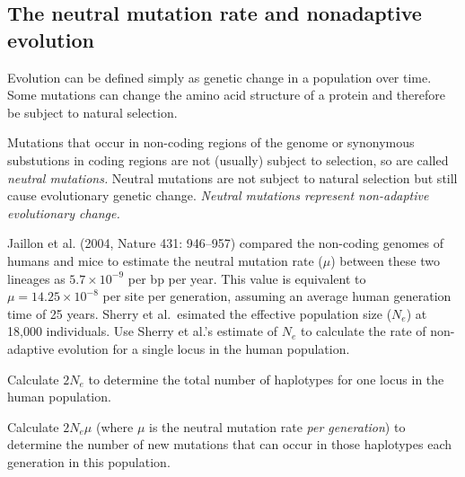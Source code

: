 \documentclass[11pt, addpoints, hidelinks]{exam}
\begin{document}
\begin{questions}
\newpage

\subsection*{The neutral mutation rate and nonadaptive evolution}

Evolution can be defined simply as genetic change in a population over time. Some mutations can change the amino acid structure of a protein and therefore be subject to natural selection.

Mutations that occur in non-coding regions of the genome or synonymous substutions in coding regions are not (usually) subject to selection, so are called \textit{neutral mutations.} Neutral mutations are not subject to natural selection but still cause evolutionary genetic change. \emph{Neutral mutations represent non-adaptive evolutionary change.} 

Jaillon et al. (2004, Nature 431: 946--957) compared the non-coding genomes of humans and mice to estimate the neutral mutation rate ($\mu$) between these two lineages as $5.7 \times 10^{-9}$ per bp per year.  This value is equivalent to $\mu = 14.25 \times 10^{-8}$ per site per generation, assuming an average human generation time of 25 years. Sherry et al.~esimated the effective population size ($N_e$) at 18,000 individuals. Use Sherry et al.'s estimate of $N_e$ to calculate  the rate of non-adaptive evolution for a single locus in the human population. 

\question
\label{itm:jaillon} Calculate $2N_e$ to determine the total number of haplotypes for one locus in the human population.

\ifprintanswers\vspace*{\baselineskip}{\bfseries%
	$2N_e = 2 \times 18,000 = 36,000$ haplotypes.}
\else
\fi


\question
Calculate $2N_e\mu$ (where $\mu$ is the neutral mutation rate \emph{per generation}) to determine the number of new mutations that can occur in those haplotypes each generation in this population.

\ifprintanswers\vspace*{\baselineskip}{\bfseries%
	$2N_e\mu = 36,000 \times 14.25 = 0.00513.$}
\else
\fi


\end{questions}
\end{document}
